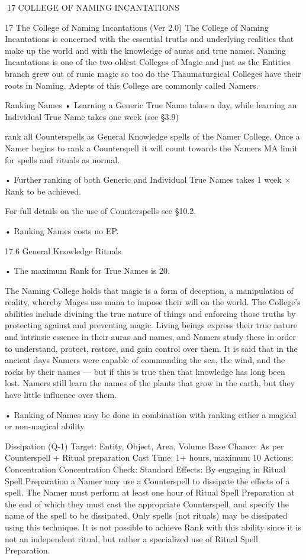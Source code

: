 \documentclass[a4paper]{article}
\begin{document}
\begin{multicols}{3}
17 COLLEGE OF NAMING INCANTATIONS

17 The College of Naming Incantations (Ver 2.0)
The College of Naming Incantations is concerned
with the essential truths and underlying realities
that make up the world and with the knowledge of
auras and true names. Naming Incantations is one
of the two oldest Colleges of Magic and just as the
Entities branch grew out of runic magic so too do
the Thaumaturgical Colleges have their roots in
Naming. Adepts of this College are commonly
called Namers.

Ranking Names
• Learning a Generic True Name takes a day, while
learning an Individual True Name takes one week
(see §3.9)

rank all Counterspells as General Knowledge spells
of the Namer College. Once a Namer begins to
rank a Counterspell it will count towards the Namers MA limit for spells and rituals as normal.

• Further ranking of both Generic and Individual
True Names takes 1 week × Rank to be achieved.

For full details on the use of Counterspells see
§10.2.

• Ranking Names costs no EP.

17.6 General Knowledge Rituals

• The maximum Rank for True Names is 20.

The Naming College holds that magic is a form of
deception, a manipulation of reality, whereby
Mages use mana to impose their will on the world.
The College’s abilities include divining the true
nature of things and enforcing those truths by
protecting against and preventing magic. Living
beings express their true nature and intrinsic essence in their auras and names, and Namers study
these in order to understand, protect, restore, and
gain control over them. It is said that in the ancient
days Namers were capable of commanding the sea,
the wind, and the rocks by their names — but if
this is true then that knowledge has long been lost.
Namers still learn the names of the plants that grow
in the earth, but they have little influence over
them.

• Ranking of Names may be done in combination
with ranking either a magical or non-magical ability.

Dissipation (Q-1)
Target: Entity, Object, Area, Volume
Base Chance: As per Counterspell + Ritual preparation
Cast Time: 1+ hours, maximum 10
Actions: Concentration
Concentration Check: Standard
Effects: By engaging in Ritual Spell Preparation a
Namer may use a Counterspell to dissipate the
effects of a spell. The Namer must perform at least
one hour of Ritual Spell Preparation at the end of
which they must cast the appropriate Counterspell,
and specify the name of the spell to be dissipated.
Only spells (not rituals) may be dissipated using
this technique. It is not possible to achieve Rank
with this ability since it is not an independent ritual, but rather a specialized use of Ritual Spell
Preparation.


\end{multicols}
\end{document}
